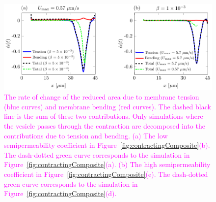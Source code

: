 \documentclass[prb,preprint,showpacs,preprintnumbers,amsmath,amssymb,longbibliography]{revtex4-1}
\newif\ifTikz
\begin{document}
\begin{figure}[htp]
  \ifTikz
  
  \else
  \includegraphics{figures/contractingRAdecomp.pdf}
  \fi
  \caption{\label{fig:contractingRAdecomp} \textcolor{magenta}{The rate
  of change of the reduced area due to membrane tension (blue curves)
  and membrane bending (red curves). The dashed black line is the sum of
  these two contributions. Only simulations where the vesicle passes
  through the contraction are decomposed into the contributions due to
  tension and bending. (a) The low semipermeability coefficient in
  Figure~\ref{fig:contractingComposite}(b). The dash-dotted green curve
  corresponds to the simulation in
  Figure~\ref{fig:contractingComposite}(a). (b) The high
  semipermeability coefficient in
  Figure~\ref{fig:contractingComposite}(e). The dash-dotted green curve
  corresponds to the simulation in
  Figure~\ref{fig:contractingComposite}(d).}}
\end{figure}
\end{document}
